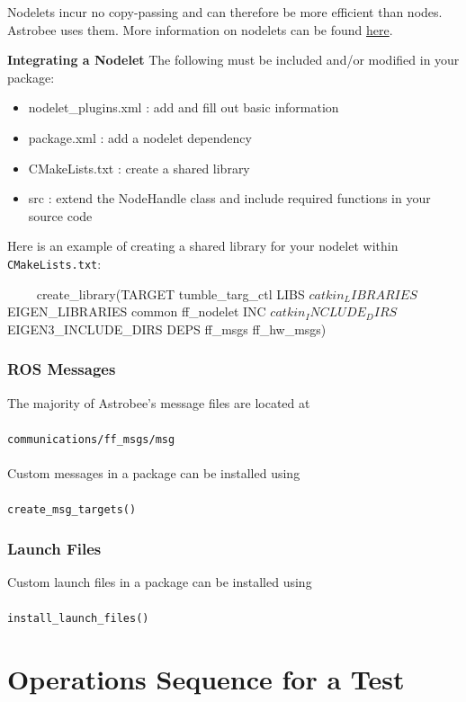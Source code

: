 \documentclass{article}
\begin{document}
Nodelets incur no copy-passing and can therefore be more efficient than nodes. Astrobee uses them. More information on nodelets can be found \href{http://wiki.ros.org/nodelet}{here}. 

\textbf{Integrating a Nodelet}
The following must be included and/or modified in your package:
\begin{itemize}
	\item nodelet\_plugins.xml : add and fill out basic information
	\item package.xml : add a nodelet dependency
	\item CMakeLists.txt : create a shared library
	\item src : extend the NodeHandle class and include required functions in your source code
\end{itemize}

Here is an example of creating a shared library for your nodelet within \texttt{CMakeLists.txt}:
\begin{markdown}
~~~~
create_library(TARGET tumble_targ_ctl
LIBS ${catkin_LIBRARIES} ${EIGEN_LIBRARIES} common ff_nodelet
INC ${catkin_INCLUDE_DIRS} ${EIGEN3_INCLUDE_DIRS}
DEPS ff_msgs ff_hw_msgs)
~~~~
\end{markdown}

\subsubsection{ROS Messages}

The majority of Astrobee's message files are located at\\\\
\texttt{communications/ff\_msgs/msg}\\\\ 

Custom messages in a package can be installed using\\\\
\texttt{create\_msg\_targets()}

\subsubsection{Launch Files}

Custom launch files in a package can be installed using\\\\
\texttt{install\_launch\_files()}


\section{Operations Sequence for a Test}
\end{document}
